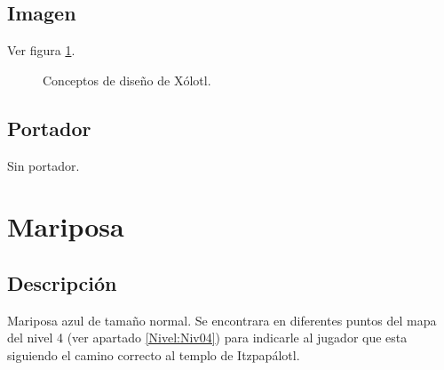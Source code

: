 	\subsection{Imagen}
	Ver figura \ref{fig:Xoloitzcuintle}.
		\begin{figure}
  			\centering
  				\caption{Conceptos de diseño de Xólotl.}
  			\label{fig:Xoloitzcuintle}
		\end{figure} 
		
	\subsection{Portador}
	Sin portador. 

	\section{Mariposa} \label{item:Mariposa}
		\subsection{Descripción}
		Mariposa azul de tamaño normal. Se encontrara en diferentes puntos del mapa del nivel 4 (ver apartado \ref{Nivel:Niv04})  para indicarle al jugador que esta siguiendo el camino correcto al templo de Itzpapálotl.
